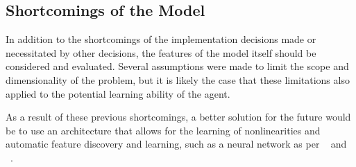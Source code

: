 
\subsection{Shortcomings of the Model}

In addition to the shortcomings of the implementation decisions made or
necessitated by other decisions,
the features of the model itself should be considered and evaluated.
%
Several assumptions were made to limit the scope and dimensionality of the
problem,
but it is likely the case that these limitations also applied to the potential
learning ability of the agent.






As a result of these previous shortcomings,
a better solution for the future would be to use an architecture that allows
for the learning of nonlinearities and automatic feature discovery and
learning,
such as a neural network
as per ~\cite{deepmind_alphago} and ~\cite{tdgammon}.

